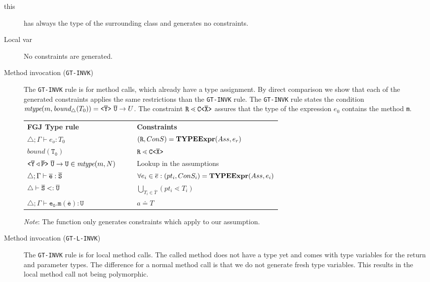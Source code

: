 \documentclass[a4paper,USenglish,cleveref, autoref, thm-restate]{lipics-v2021}
\begin{document}
\begin{description}
  \item [this]
  has always the type of the surrounding class and generates no constraints.
  \item [Local var]
  No constraints are generated.
  \item[Method invocation (\texttt{GT-INVK})]
The \texttt{GT-INVK} rule is for method calls, which already have a type assignment.
By direct comparison we show that each of the generated constraints applies the same restrictions than the \texttt{GT-INVK} rule.
The \texttt{GT-INVK} rule states the condition $\textit{mtype}(m, \textit{bound}_\triangle(T_0)) = \mathtt{ \texttt{<} \overline{\tt Y} \texttt{>} }\ \overline{\tt U} \to U$.
The constraint $\texttt{R} \lessdot \mathtt{C \texttt{<} \overline{\tt X} \texttt{>} }$ assures that the type of the expression $e_0$ contains the method \texttt{m}.

\begin{small}
\begin{tabularx}{\linewidth}{lX|Xl}
  \textbf{FGJ Type rule} &&& \textbf{Constraints} \\
  $\triangle; \Gamma \vdash e_o : T_0$ &&& $(\texttt{R}, ConS) = \textbf{TYPEExpr}(Ass, e_r)$\\ 
  $\mathtt{\textit{bound}(T_0)}$ &&& $\texttt{R} \lessdot \mathtt{C \texttt{<} \overline{\tt X} \texttt{>} }$ \\
  $\mathtt{\exptype{}{\ol{Y} \triangleleft \ol{P}}\ \ol{U} \to U} \in \textit{mtype}(m, N)$ &&& Lookup in the assumptions \\
 $\triangle; \Gamma \vdash \overline{\tt e} : \overline{\tt S}$ &&& $\forall e_i \in \overline{e} : (pt_i, ConS_i) = \textbf{TYPEExpr}(Ass, e_i)$\\
 $\triangle \vdash \overline{\tt S} <: \overline{\tt U}$ &&& $ \bigcup_{T_i \in \overline{T}} (pt_i \lessdot T_i)$\\
 $\triangle; \Gamma \vdash \mathtt{e_0.m(\overline{e}) : U }$ &&& $a \doteq T$ \\
\end{tabularx}
\end{small}

\textit{Note}: The \typeExpr function only generates constraints which apply to our assumption.
\item[Method invocation (\texttt{GT-L-INVK})]
The \texttt{GT-INVK} rule is for local method calls.
The called method does not have a type yet and comes with type variables for the return and parameter types.
The difference for a normal method call is that we do not generate fresh type variables.
This results in the local method call not being polymorphic.



\end{description}
\end{document}

